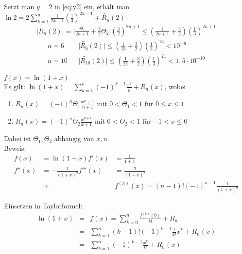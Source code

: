 \documentclass[ngerman,titlepage,twoside, parskip=half*]{scrreprt}
\theoremstyle{plain}
\theoremstyle{definition}
\theoremstyle{remark}
\newcommand*{\abs}[2][]{#1\lvert#2#1\rvert}
\begin{document}
Setzt man $y=2$ in \autoref{eq:y2} ein, erhält man $\ln 2=2\sum_{k=1}^n 
\frac{1}{2k-1}\left( \frac{1}{3} \right)^{2k-1}+\widetilde{R_n}(2)$:
\begin{gather*}\abs{\widetilde{R_n}(2)}=\abs{\frac{\Theta_1}{2n+1}+\frac{3}{2}\Theta_2}
\left( \frac{3}{2} \right)^{2n+1}\leq\left( \frac{1}{2n+1}+\frac{3}{2} \right)
\left( \frac{1}{3} \right)^{2n+1}\end{gather*}
\begin{align*}
  n=6 & & \abs{\widetilde{R_6}(2)}\leq \left( \frac{1}{13}+\frac{3}{2} \right)
  \left( \frac{1}{3} \right)^{13}<10^{-6}\\
  n=10 & & \abs{\widetilde{R_{10}}(2)}\leq \left( \frac{1}{21}+\frac{3}{2} \right)
  \left( \frac{1}{3} \right)^{21}<1,5\cdot 10^{-10}
\end{align*}

$f(x)=\ln(1+x)$\\
Es gilt: $\ln(1+x)=\sum_{k=1}^n (-1)^{k-1}\frac{x^k}{k}+R_n(x)$, wobei
\begin{enumerate}
  \item $R_n(x)=(-1)^n \Theta_1\frac{x^n+1}{n+1}$ mit $0<\Theta_1<1$ für 
    $0\leq x\leq 1$
  \item $R_n(x)=(-1)^n\Theta_2\frac{x^{n+1}}{x+1}$ mit $0<\Theta_2<1$ für
    $-1<x\leq 0$
\end{enumerate}
Dabei ist  $\Theta_1,\Theta_2$ abhängig von $x,n$.\\
Beweis:
\begin{align*}
  f(x)&=\ln(1+x)  f'(x)&=\frac{1}{1+x}\\
  f''(x)&=-\frac{1}{(1+x)^2}  f'''(x)&=\frac{2}{(1+x)^3}\\
  &\Longrightarrow &f^{(n)}(x)=(n-1)!(-1)^{n-1}\frac{1}{(1+x)^n}
\end{align*}

Einsetzen in Taylorformel:
\begin{align*}
  \ln(1+x)&=& f(x)=\sum_{k=0}^n \frac{f^{(k)}(0)}{k!}+R_n\\
  &=& \sum_{k=1}^n (k-1)!(-1)^{k-1}\frac{1}{k!}x^k+R_n(x)\\
  &=& \sum_{k=1}^n (-1)^{k-1}\frac{x^k}{k!}+R_n(x)
\end{align*}
\end{document}
